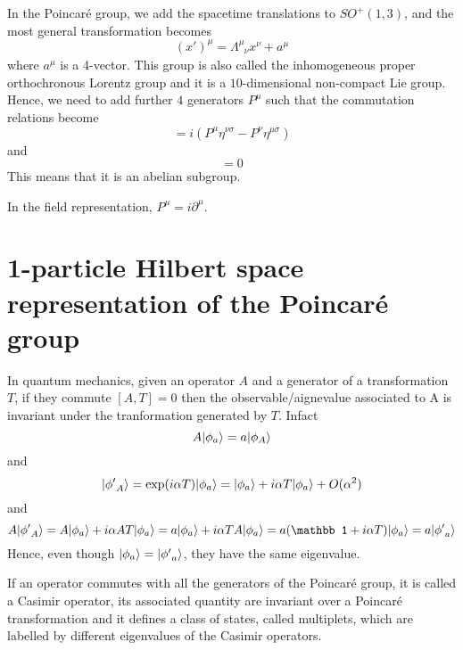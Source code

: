     In the Poincaré group, we add the spacetime translations to $SO^+(1,3)$, and the most general transformation becomes 
    \begin{equation*}
        (x')^\mu = \Lambda^\mu_{\phantom \mu \nu} x^\nu + a^\mu
    \end{equation*}
    where $a^\mu$ is a 4-vector. This group is also called the inhomogeneous proper orthochronous Lorentz group and it is a $10$-dimensional non-compact Lie group. Hence, we need to add further $4$ generators $P^\mu$ such that the commutation relations become
    \begin{equation*}
        [M^{\mu\nu} P^\sigma] = i (P^\mu \eta^{\nu\sigma} - P^\nu \eta^{\mu \sigma})
    \end{equation*}
    and
    \begin{equation}
        [P^\mu, P^\nu] = 0 
    \end{equation}
    This means that it is an abelian subgroup.

    In the field representation, $P^\mu = i \partial^\mu$.

\section{1-particle Hilbert space representation of the Poincaré group}
    
    In quantum mechanics, given an operator $A$ and a generator of a transformation $T$, if they commute $[A, T] = 0$ then the observable/aignevalue associated to A is invariant under the tranformation generated by $T$. Infact 
    \begin{equation*}
        A \vert\phi_a\rangle = a \vert\phi_A\rangle
    \end{equation*}
    and 
    \begin{equation*}
        \vert{\phi'}_A\rangle = \exp(i \alpha T) \vert\phi_a\rangle = \vert\phi_a\rangle + i \alpha T \vert\phi_a\rangle + O(\alpha^2)
    \end{equation*}
    and 
    \begin{equation*}
        A \ket{{\phi'}_A} = A \ket{\phi_a} + i \alpha A T \ket{\phi_a} = a \ket{\phi_a} + i \alpha T A \ket{\phi_a} = a (\mathbb 1 + i \alpha T) \ket{\phi_a} = a \ket {{\phi'}_a}
    \end{equation*}
    Hence, even though $\vert\phi_a\rangle = \vert{\phi'}_a\rangle$, they have the same eigenvalue. 

    If an operator commutes with all the generators of the Poincaré group, it is called a Casimir operator, its associated quantity are invariant over a Poincaré transformation and it defines a class of states, called multiplets, which are labelled by different eigenvalues of the Casimir operators.

